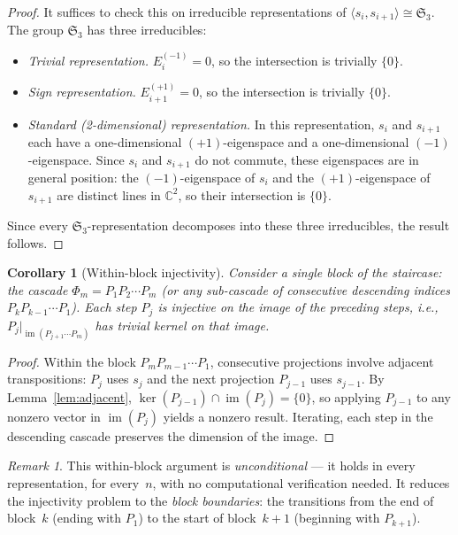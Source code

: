 \documentclass[11pt]{article}
\newtheorem{corollary}[theorem]{Corollary}
\theoremstyle{definition}
\theoremstyle{remark}
\newtheorem{remark}[theorem]{Remark}
\newcommand{\CC}{\mathbb{C}}
\newcommand{\Sym}{\mathfrak{S}}
\newcommand{\im}{\operatorname{im}}
\begin{document}
\begin{proof}
It suffices to check this on irreducible representations of
$\langle s_i, s_{i+1} \rangle \cong \Sym_3$.
The group $\Sym_3$ has three irreducibles:
\begin{itemize}
\item \emph{Trivial representation.}
  $E_i^{(-1)} = 0$, so the intersection is trivially $\{0\}$.
\item \emph{Sign representation.}
  $E_{i+1}^{(+1)} = 0$, so the intersection is trivially $\{0\}$.
\item \emph{Standard (2-dimensional) representation.}
  In this representation, $s_i$ and $s_{i+1}$ each have a
  one-dimensional $(+1)$-eigenspace and a one-dimensional
  $(-1)$-eigenspace. Since $s_i$ and $s_{i+1}$ do not commute,
  these eigenspaces are in general position: the $(-1)$-eigenspace
  of $s_i$ and the $(+1)$-eigenspace of $s_{i+1}$ are distinct
  lines in $\CC^2$, so their intersection is $\{0\}$.
\end{itemize}
Since every $\Sym_3$-representation decomposes into these three
irreducibles, the result follows.
\end{proof}

\begin{corollary}[Within-block injectivity]\label{cor:within-block}
Consider a single block of the staircase: the cascade
$\Phi_m = P_1 P_2 \cdots P_m$ (or any sub-cascade of consecutive
descending indices $P_k P_{k-1} \cdots P_1$).
Each step $P_j$ is injective on the image of the preceding
steps, i.e., $P_j|_{\im(P_{j+1} \cdots P_m)}$ has trivial kernel
on that image.
\end{corollary}

\begin{proof}
Within the block $P_m P_{m-1} \cdots P_1$, consecutive projections
involve adjacent transpositions: $P_j$ uses $s_j$ and the next
projection $P_{j-1}$ uses $s_{j-1}$. By Lemma~\ref{lem:adjacent},
$\ker(P_{j-1}) \cap \im(P_j) = \{0\}$, so applying $P_{j-1}$
to any nonzero vector in $\im(P_j)$ yields a nonzero result.
Iterating, each step in the descending cascade preserves the
dimension of the image.
\end{proof}

\begin{remark}
This within-block argument is \emph{unconditional} --- it holds
in every representation, for every~$n$, with no computational
verification needed. It reduces the injectivity problem to
the \emph{block boundaries}: the transitions from the end of
block~$k$ (ending with $P_1$) to the start of block~$k{+}1$
(beginning with $P_{k+1}$).
\end{remark}
\end{document}

